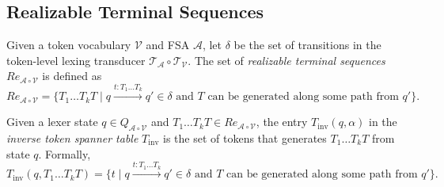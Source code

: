 \subsection{Realizable Terminal Sequences}
\begin{definition}
    \label{def:RealizableTerminalSequence}
    Given a token vocabulary $\mathcal{V}$ and FSA $\mathcal{A}$, let $\delta$ be the set of transitions in the token-level lexing transducer $\mathcal{T}_{\mathcal{A}} \circ \mathcal{T}_{\mathcal{V}}$. The set of \textit{realizable terminal sequences} $Re_{\mathcal{A} \circ \mathcal{V}}$ is defined as
    \[
    Re_{\mathcal{A} \circ \mathcal{V}} = \{ T_1 \ldots T_k T \mid q \xrightarrow{t:T_1 \ldots T_k} q' \in \delta \text{ and } T \text{ can be generated along some path from } q' \}.
    \]
\end{definition}

\begin{definition}
    \label{def:InverseTokenSpannerTable}
    Given a lexer state $q \in Q_{\mathcal{A} \circ \mathcal{V}}$ and $T_1 \ldots T_k T \in Re_{\mathcal{A} \circ \mathcal{V}}$, the entry $T_{\text{inv}}(q, \alpha)$ in the \textit{inverse token spanner table} $T_{\text{inv}}$ is the set of tokens that generates $T_1 \ldots T_k T$ from state $q$. Formally,
    \[
    T_{\text{inv}}(q, T_1 \ldots T_k T) = \{ t \mid q \xrightarrow{t:T_1 \ldots T_k} q' \in \delta \text{ and } T \text{ can be generated along some path from } q' \}.
    \]
\end{definition}

